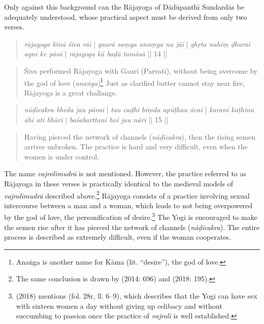 Only against this background can the Rājayoga of Dādūpanthī Sundardās be adequately understood, whose practical aspect must be derived from only two verses.

\begin{quote}
\textit{rājayoga kīnā śiva rāī} | \textit{gaurā saṃga anaṃga na jāī} |
\textit{ghṛta nahiṃ ḍharai agni ke pāsā} | \textit{rājayoga kā baḍā tamāsā} || 14 ||
\end{quote}
\begin{quote}
Śiva performed Rājayoga with Gaurī (Parvatī), without being overcome by the god of love (\textit{anaṅga})\footnote{Anaṅga is another name for Kāma (lit. ``desire''), the god of love.} Just as clarified butter cannot stay near fire, Rājayoga is a great challange.   
\end{quote}
\begin{quote}
\textit{nāḍīcakra bheda jau pāvai} | \textit{tau caḍhi biṃda apūṭhau āvai} | 
\textit{karanī kaṭhina āhi ati bhārī} | \textit{baśabarttanī hoi jau nārī} || 15 || 
\end{quote}
\begin{quote}
  Having pierced the network of channels (\textit{nāḍīcakra}), then the rising semen arrives unbroken.
  The practice is hard and very difficult, even when the women is under control. 
\end{quote}

The name \textit{vajrolīmudrā} is not mentioned. However, the practice referred to as Rājayoga in these verses is practically identical to the medieval models of \textit{vajrolīmudrā} described above.\footnote{The same conclusion is drawn by \citeauthor{burger2014sarvangayogapradipika} (2014: 696) and \citeauthor{mallinson2018vajrolimudra} (2018: 195).} Rājayoga consists of a practice involving sexual intercourse between a man and a woman, which leads to not being overpowered by the god of love, the personification of desire.\footnote{\citeauthor{mallinson2018vajrolimudra} (2018) mentions  (fol. 28r, ll. 6–9), which describes that the Yogi can have sex with sixteen women a day without giving up celibacy and without succumbing to passion once the practice of \textit{vajrolī} is well established.} The Yogi is encouraged to make the semen rise after it has pierced the network of channels (\textit{nāḍīcakra}). The entire process is described as extremely difficult, even if the woman cooperates.


